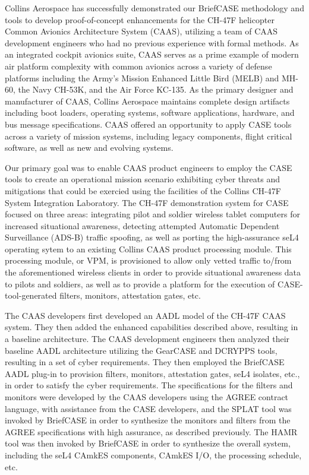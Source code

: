 Collins Aerospace has successfully demonstrated our BriefCASE methodology and tools to
develop proof-of-concept enhancements for the  CH-47F helicopter Common Avionics
Architecture System (CAAS), utilizing a team of CAAS development engineers who had no
previous experience with formal methods.  As an integrated cockpit avionics suite, CAAS serves
as a prime example of modern air platform complexity with common avionics across a variety of
defense platforms including the Army's Mission Enhanced Little Bird (MELB)  and MH-60, the
Navy CH-53K, and the Air Force KC-135. As the primary designer and manufacturer of CAAS,
Collins Aerospace maintains complete design artifacts including boot loaders, operating systems,
software applications, hardware, and bus message specifications. CAAS offered an opportunity to
apply CASE tools across a variety of mission systems, including legacy components, flight critical
software, as well as new and evolving systems.

Our primary goal was to enable CAAS product engineers to employ the CASE tools to create an
operational mission scenario exhibiting cyber threats and mitigations that could be exercied using
the facilities of the Collins CH-47F System Integration Laboratory. The CH-47F demonstration system
for CASE focused on three areas: integrating pilot and soldier wireless tablet computers for
increased situational awareness, detecting attempted Automatic Dependent Surveillance (ADS-B)
traffic spoofing, as well as porting the high-assurance seL4 operating sytem to an existing Collins
CAAS product processing module. This processing module, or VPM, is provisioned to allow only vetted
traffic to/from the aforementioned wireless clients in order to provide situational awareness data
to pilots and soldiers, as well as to provide a platform for the execution of CASE-tool-generated
filters, monitors, attestation gates, etc.

The CAAS developers first developed an AADL model of the CH-47F CAAS system. They then added the
enhanced capabilities described above, resulting in a baseline architecture. The CAAS development
engineers then analyzed their baseline AADL architecture utilizing the GearCASE and DCRYPPS tools,
resulting in a set of cyber requirements. They then employed the BriefCASE AADL plug-in to provision
filters, monitors, attestation gates, seL4 isolates, etc., in order to satisfy the cyber
requirements. The specifications for the filters and monitors were developed by the CAAS developers
using the AGREE contract language, with assistance from the CASE developers, and the SPLAT tool was
invoked by BriefCASE in order to synthesize the monitors and filters from the AGREE specifications
with high assurance, as described previously. The HAMR tool was then invoked by BriefCASE in order
to synthesize the overall system, including the seL4 CAmkES components, CAmkES I/O, the processing
schedule, etc.

